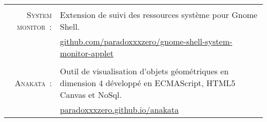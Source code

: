 \documentclass[a4paper,10pt]{article}
\begin{document}
\begin{tabular}{r|p{11cm}}
    \multicolumn{2}{c}{} \\
    \textsc{System monitor :}
      & Extension de suivi des ressources système pour Gnome Shell. \\
      & \href{https://github.com/paradoxxxzero/gnome-shell-system-monitor-applet}{github.com/paradoxxxzero/gnome-shell-system-monitor-applet} \\

    \multicolumn{2}{c}{} \\
    \textsc{Anakata :}
      & Outil de visualisation d’objets géométriques en dimension 4 développé en ECMAScript, HTML5 Canvas et NoSql. \\
      & \href{http://paradoxxxzero.github.io/anakata/}{paradoxxxzero.github.io/anakata} \\
  \end{tabular}
\end{document}

